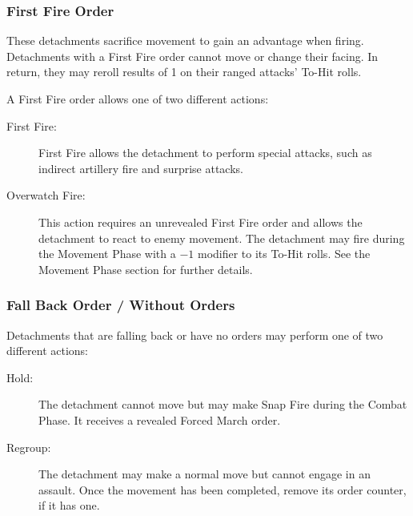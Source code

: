 \subsubsection{First Fire Order}

These detachments sacrifice movement to gain an advantage when firing. Detachments with a First Fire order cannot move or change their facing. In return, they may reroll results of 1 on their ranged attacks' To-Hit rolls.

A First Fire order allows one of two different actions:

\begin{description}
    \item[First Fire:] First Fire allows the detachment to perform special attacks, such as indirect artillery fire and surprise attacks.

    \item[Overwatch Fire:] This action requires an unrevealed First Fire order and allows the detachment to react to enemy movement. The detachment may fire during the Movement Phase with a $-1$ modifier to its To-Hit rolls. See the Movement Phase section for further details.
\end{description}

\subsubsection{Fall Back Order / Without Orders}

Detachments that are falling back or have no orders may perform one of two different actions:

\begin{description}
    \item[Hold:] The detachment cannot move but may make Snap Fire during the Combat Phase. It receives a revealed Forced March order.

    \item[Regroup:] The detachment may make a normal move but cannot engage in an assault. Once the movement has been completed, remove its order counter, if it has one.
\end{description}

